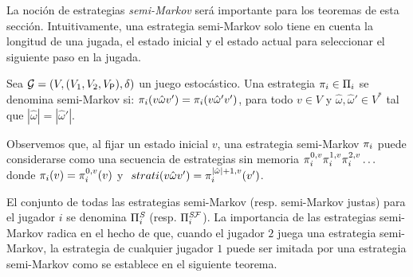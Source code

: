 La noción de estrategias \emph{semi-Markov} \cite{FilarV96} será importante para los teoremas de esta sección. Intuitivamente, una estrategia semi-Markov solo tiene en cuenta la longitud de una jugada, el estado inicial y el estado actual para seleccionar el siguiente paso en la jugada.
        
\begin{definition}\label{def:semimarkov:strategy} Sea $\mathcal{G} = (V, (V_1, V_2, V_{\mathsf{P}}), \delta)$ un juego estocástico. Una estrategia $\pi_{i} \in \Pi_{i}$ se denomina semi-Markov si: $\pi_{i}(v \hat{\omega}v') = \pi_{i}(v \hat{\omega}'v')$, para todo $v \in V$ y $\hat{\omega}, \hat{\omega}' \in V^*$ tal que $|\hat{\omega}|=|\hat{\omega}'|$. 
\end{definition}


Observemos que, al fijar un estado inicial $v$, una estrategia semi-Markov $\pi_{i}$ puede considerarse como una secuencia de estrategias sin memoria $\pi_{i}^{0,v}\pi_{i }^{1,v}\pi_{i}^{2,v}\ldots$ donde $\pi_{i}(v)=\pi_{i}^{0,v}(v)$ y $\ strat{i}(v\hat{\omega}v')=\strat{i}^{|\hat{\omega}|+1,v}(v')$.



El conjunto de todas las estrategias semi-Markov (resp. semi-Markov justas) para el jugador $i$ se denomina $\Pi^{\textit{S}}_{i}$ (resp. $\Pi^{\textit{S}\mathcal{F}}_{i}$). La importancia de las estrategias semi-Markov radica en el hecho de que, cuando el jugador $2$ juega una estrategia semi-Markov, la estrategia de cualquier jugador $1$ puede ser imitada por una estrategia semi-Markov como se establece en el siguiente teorema.

